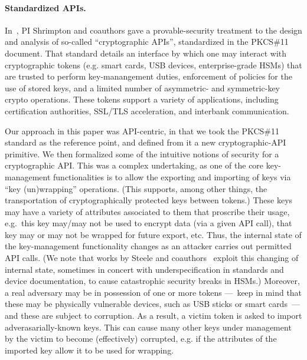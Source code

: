\paragraph{Standardized APIs. }
%
In~\cite{SSW}, PI Shrimpton and coauthors gave a provable-security treatment to the design and
analysis of so-called ``cryptographic APIs'', standardized in the PKCS\#11
document\cite{xxx}.  That standard details an interface by which one may
interact with cryptographic tokens (e.g. smart cards, USB devices,
enterprise-grade HSMs) that are trusted to perform key-manangement duties,
enforcement of policies for the use of stored keys, and a limited number of
asymmetric- and symmetric-key crypto operations.  These tokens support a variety
of applications, including certification authorities, SSL/TLS acceleration, and
interbank communication.
%

Our approach in this paper was API-centric, in that we took the PKCS\#11
standard as the reference point, and defined from it a new cryptographic-API
primitive.
%
%
We then formalized some of the intuitive notions of security for a
cryptographic API.  This was a complex undertaking, as one of the core
key-management functionalities is to allow the exporting and importing of keys
via ``key (un)wrapping'' operations.  (This supports, among other things, the
transportation of cryptographically protected keys between tokens.)  These keys
may have a variety of attributes associated to them that proscribe their usage,
e.g.\ this key may/may not be used to encrypt data (via a given API call), that
key may or may not be wrapped for future export, etc.  Thus, the internal state of
the key-management functionality changes as an attacker carries out permitted
API calls. (We note that works by Steele and coauthors~\cite{xxx,yyy,zzz}
exploit this changing of internal state, sometimes in concert with
underspecification in standards and device documentation, to cause catastrophic
security breaks in HSMs.) Moreover, a real adversary may be in possession of one
or more tokens ---~keep in mind that these may be physically vulnerable devices,
such as USB sticks or smart cards~--- and these are subject to corruption.  As a
result, a victim token is asked to import adverasarially-known keys.  This can
cause many other keys under management by the victim to become (effectively)
corrupted, e.g. if the attributes of the imported key allow it to be used for
wrapping.
%


